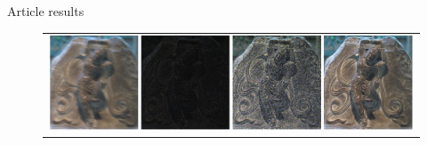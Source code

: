 \documentclass[french]{beamer}
\theoremstyle{plain}
\theoremstyle{remark}
\begin{document}
\begin{frame}{Article results}

\begin{figure}
\begin{center}
	\begin{tabular}{c}	
		\includegraphics[scale=0.28]{images/results.png}
	\end{tabular}
\end{center}
\end{figure}

\end{frame}
\end{document}
